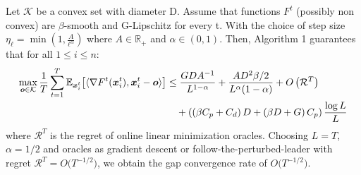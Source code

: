 \setcounter{theorem}{0}

\begin{theorem}
Let $\mathcal{K}$ be a convex set with diameter D. Assume that functions $F^{t}$ (possibly non convex) are $\beta$-smooth and G-Lipschitz for every t. With the choice of step size $\eta_{\ell} = \min\left(1, \frac{A}{\ell^{\alpha}}\right)$ where $A \in \mathbb{R_{+}}$ and $\alpha \in (0,1)$. 
Then, Algorithm 1 guarantees that for all $1 \leq i \leq n$:
%
    \begin{align*}
       \max_{\bm{o} \in \mathcal{K}}\frac{1}{T} \sum_{t=1}^{T} \mathbb{E}_{\bm{x}^t_i} \bigl [\langle \nabla F^{t}(\bm{x}^t_{i}), \bm{x}^t_{i} - \bm{o}\rangle \bigr] \nonumber 
       & \leq \frac{GDA^{-1}}{L^{1-\alpha}}  
         + \frac{AD^2 \beta/2}{L^{\alpha}(1-\alpha)} + O \left(\mathcal{R}^{T}\right) \notag \\
        & \quad + \left(\left( \beta C_p + C_d \right)D + \left(\beta D + G \right)C_p \right)\frac{\log L}{L}
    \end{align*}
where $\mathcal{R}^T$ is the regret of online linear minimization oracles.
Choosing $L=T$, $\alpha = 1/2$ and oracles as gradient descent or follow-the-perturbed-leader with regret $\mathcal{R}^T =
O\bigl(T^{-1/2}\bigr)$, we obtain the gap convergence rate of $O\bigl(T^{-1/2}\bigr)$.
\end{theorem}
%
